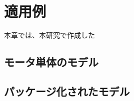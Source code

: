 \chapter{適用例}\label{cha:Indication}
本章では、本研究で作成した


\section{モータ単体のモデル}




\section{パッケージ化されたモデル}

